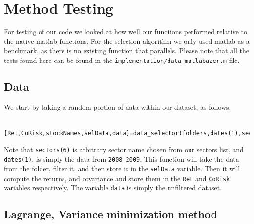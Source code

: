 \documentclass[12pt,titlepage,letter]{article}
\begin{document}
\section{Method Testing}

	\begin{par}
		For testing of our code we looked at how well our functions performed relative to the native matlab functions. For the selection algorithm we only used matlab as a benchmark, as there is no existing function that parallels. Please note that all the tests found here can be found in the \texttt{implementation/data\_matlabazer.m} file.
	\end{par} \vspace{1em}

	\subsection{Data}

	\begin{par}
		We start by taking a random portion of data within our dataset, as follows:
	\end{par}
	\begin{verbatim}
		[Ret,CoRisk,stockNames,selData,data]=data_selector(folders,dates(1),sectors(6));
	\end{verbatim}
	\begin{par}
		Note that \texttt{sectors(6)} is arbitrary sector name chosen from our sectors list, and \texttt{dates(1)}, is simply the data from \texttt{2008-2009}. This function will take the data from the folder, filter it, and then store it in the \texttt{selData} variable. Then it will compute the returns, and covariance and store them in the \texttt{Ret} and \texttt{CoRisk} variables respectively. The variable \texttt{data} is simply the unfiltered dataset.
	\end{par} \vspace{1em}

	\subsection{Lagrange, Variance minimization method}
\end{document}
